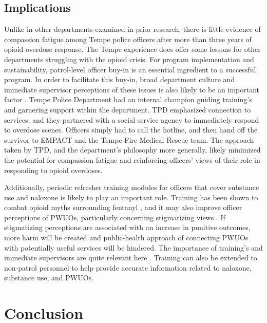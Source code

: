 \subsection{Implications}
Unlike in other departments examined in prior research, there is little evidence of compassion fatigue among Tempe police officers after more than three years of opioid overdose response. The Tempe experience does offer some lessons for other departments struggling with the opioid crisis. For program implementation and sustainability, patrol-level officer buy-in is an essential ingredient to a successful program. In order to facilitate this buy-in, broad department culture and immediate supervisor perceptions of these issues is also likely to be an important factor \parencite{del_pozo_police_2024}. Tempe Police Department had an internal champion guiding training's and garnering support within the department. TPD emphasized connection to services, and they partnered with a social service agency to immediately respond to overdose scenes. Officers simply had to call the hotline, and then hand off the survivor to EMPACT and the Tempe Fire Medical Rescue team. The approach taken by TPD, and the department’s philosophy more generally, likely minimized the potential for compassion fatigue and reinforcing officers’ views of their role in responding to opioid overdoses.

Additionally, periodic refresher training modules for officers that cover substance use and naloxone is likely to play an important role. Training has been shown to combat opioid myths surrounding fentanyl \parencite{del_pozo_can_2021}, and it may also improve officer perceptions of PWUOs, particularly concerning stigmatizing views \parencite{winograd_concerns_2019}. If stigmatizing perceptions are associated with an increase in punitive outcomes, more harm will be created \parencite{binswanger_clinical_2016, ray_spatiotemporal_2023} and public-health approach of connecting PWUOs with potentially useful services will be hindered. The importance of training's and immediate supervisors are quite relevant here \parencite{del_pozo_police_2024}. Training can also be extended to non-patrol personnel to help provide accurate information related to naloxone, substance use, and PWUOs. 

\section{Conclusion}

